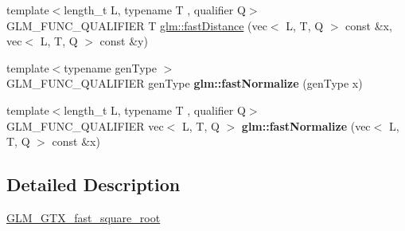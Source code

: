 \begin{DoxyCompactItemize}
\item 
{\footnotesize template$<$length\+\_\+t L, typename T , qualifier Q$>$ }\\G\+L\+M\+\_\+\+F\+U\+N\+C\+\_\+\+Q\+U\+A\+L\+I\+F\+I\+ER T \hyperlink{group__gtx__fast__square__root_ga42d3e771fa7cb3c60d828e315829df19}{glm\+::fast\+Distance} (vec$<$ L, T, Q $>$ const \&x, vec$<$ L, T, Q $>$ const \&y)
\item 
\mbox{\label{fast__square__root_8inl_ae90408b1ac7a31212f0de6e19f6373aa}} 
{\footnotesize template$<$typename gen\+Type $>$ }\\G\+L\+M\+\_\+\+F\+U\+N\+C\+\_\+\+Q\+U\+A\+L\+I\+F\+I\+ER gen\+Type {\bfseries glm\+::fast\+Normalize} (gen\+Type x)
\item 
\mbox{\label{fast__square__root_8inl_a9b1f647ce311a10c2589b1309b58c78b}} 
{\footnotesize template$<$length\+\_\+t L, typename T , qualifier Q$>$ }\\G\+L\+M\+\_\+\+F\+U\+N\+C\+\_\+\+Q\+U\+A\+L\+I\+F\+I\+ER vec$<$ L, T, Q $>$ {\bfseries glm\+::fast\+Normalize} (vec$<$ L, T, Q $>$ const \&x)
\end{DoxyCompactItemize}


\subsection{Detailed Description}
\hyperlink{group__gtx__fast__square__root}{G\+L\+M\+\_\+\+G\+T\+X\+\_\+fast\+\_\+square\+\_\+root} 